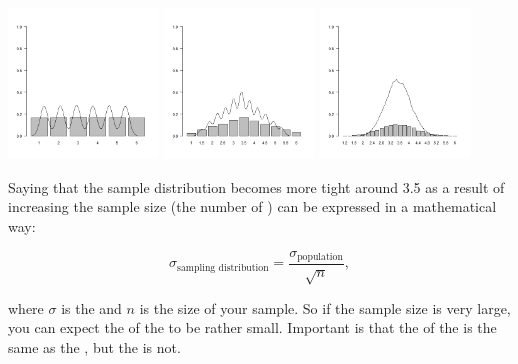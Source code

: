 \begin{center}
    \includegraphics[width=0.3\textwidth]{Files/Images/clm1.png}
    \includegraphics[width=0.3\textwidth]{Files/Images/clm2.png}
    \includegraphics[width=0.3\textwidth]{Files/Images/clm5.png} \\
     \hspace{3.3cm}  \hspace{3.3cm} 
\end{center}

Saying that the sample distribution becomes more tight around 3.5 as a result of increasing the sample size (the number of ) can be expressed in a mathematical way:

\begin{equation*}
    \sigma_{\text{sampling distribution}} = \frac{\sigma_{\text{population}}}{\sqrt{n}},
\end{equation*}

where $\sigma$ is the  and $n$ is the size of your sample. So if the sample size is very large, you can expect the  of the  to be rather small. Important is that the  of the  is the same as the , but the  is not. 

\clearpage %